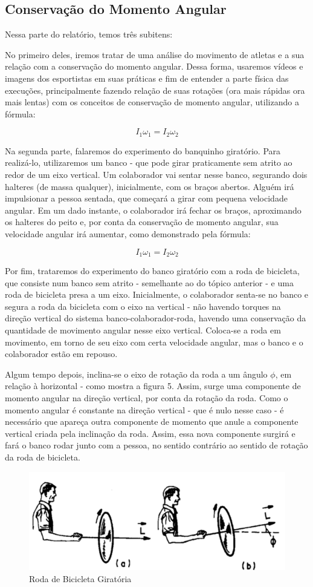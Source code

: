 \subsection{Conservação do Momento Angular}
Nessa parte do relatório, temos três subitens:

No primeiro deles, iremos tratar de uma análise do movimento de atletas e a sua relação com a conservação do momento angular. Dessa forma, usaremos vídeos e imagens dos esportistas em suas práticas e fim de entender a parte física das execuções, principalmente fazendo relação de suas rotações (ora mais rápidas ora mais lentas) com os conceitos de conservação de momento angular, utilizando a fórmula:

\[I_1 \omega _1 = I_2 \omega _2 \]

Na segunda parte, falaremos do experimento do banquinho giratório. Para realizá-lo, utilizaremos um banco - que pode girar praticamente sem atrito ao redor de um eixo vertical. Um colaborador vai sentar nesse banco, segurando dois halteres (de massa qualquer), inicialmente, com os braços abertos. Alguém irá impulsionar a pessoa sentada, que começará a girar com pequena velocidade angular. Em um dado instante, o colaborador irá fechar os braços, aproximando os halteres do peito e, por conta da conservação de momento angular, sua velocidade angular irá aumentar, como demonstrado pela fórmula:

\[I_1 \omega _1 = I_2 \omega _2 \]

Por fim, trataremos do experimento do banco giratório com a roda de bicicleta, que consiste num banco sem atrito - semelhante ao do tópico anterior - e uma roda de bicicleta presa a um eixo. Inicialmente, o colaborador senta-se no banco e segura a roda da bicicleta com o eixo na vertical - não havendo torques na direção vertical do sistema banco-colaborador-roda, havendo uma conservação da quantidade de movimento angular nesse eixo vertical. Coloca-se a roda em movimento, em torno de seu eixo com certa velocidade angular, mas o banco e o colaborador estão em repouso.

Algum tempo depois, inclina-se o eixo de rotação da roda a um ângulo $\phi$, em relação à horizontal - como mostra a figura 5. Assim, surge uma componente de momento angular na direção vertical, por conta da rotação da roda. Como o momento angular é constante na direção vertical - que é nulo nesse caso - é necessário que apareça outra componente de momento que anule a componente vertical criada pela inclinação da roda. Assim, essa nova componente surgirá e fará o banco rodar junto com a pessoa, no sentido contrário ao sentido de rotação da roda de bicicleta.

\begin{figure}[H]
  \centering
  \includegraphics[scale=1]{images/i5.png}
  \caption{Roda de Bicicleta Giratória}
\end{figure}
